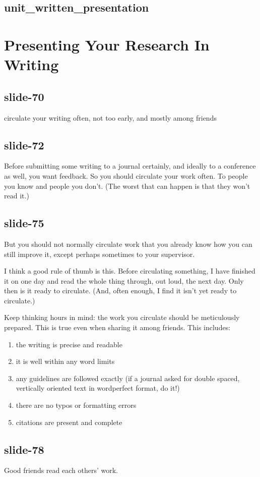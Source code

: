 \documentclass[12pt,\papersize]{extarticle}
\begin{document}
\subsection{unit\_written\_presentation}
 
 
\section{Presenting Your Research In Writing}
 
\subsection{slide-70}
circulate your writing often, 
not too early, and 
mostly among friends
 
\subsection{slide-72}
Before submitting some writing to a journal certainly, and ideally to a conference as well,
you want feedback.
So you should circulate your work often.
To people you know and people you don't.  (The worst that can happen is that they won't read it.)
 
\subsection{slide-75}
But you should not normally circulate work that you already know how you can still improve it, except 
perhaps sometimes to your supervisor.
 
I think a good rule of thumb is this.  
Before circulating something, I have finished it on one day
and read the whole thing through, out loud, the next day.
Only then is it ready to circulate. (And, often enough, I find it isn't yet ready to circulate.)
 
Keep thinking hours in mind: the work you circulate should be meticulously prepared.
This is true even when sharing it among friends.
This includes:
\begin{enumerate}
\item the writing is precise and readable
\item it is well within any word limits
\item any guidelines are followed exactly (if a journal asked for double spaced, vertically oriented text in wordperfect format, do it!)
\item there are no typos or formatting errors
\item citations are present and complete 
\end{enumerate}
 
\subsection{slide-78}
Good friends read each others’ work.
 

 






\end{document}
